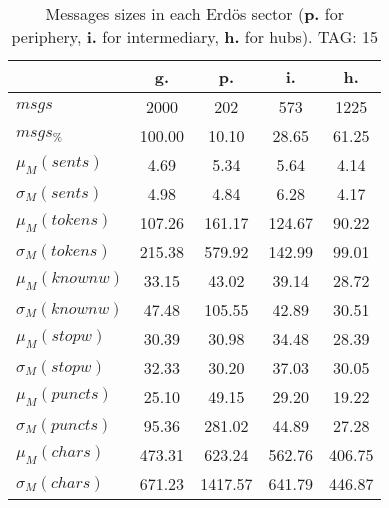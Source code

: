 \begin{table}[h!]
\begin{center}
\begin{tabular}{| l | c | c | c | c |}\hline
 & g. & p. & i. & h. \\\hline
$msgs$ & 2000  & 202  & 573  & 1225 \\\hline
$msgs_{\%}$ & 100.00  & 10.10  & 28.65  & 61.25 \\\hline
$\mu_M(sents)$ & 4.69  & 5.34  & 5.64  & 4.14 \\\hline
$\sigma_M(sents)$ & 4.98  & 4.84  & 6.28  & 4.17 \\\hline
$\mu_M(tokens)$ & 107.26  & 161.17  & 124.67  & 90.22 \\\hline
$\sigma_M(tokens)$ & 215.38  & 579.92  & 142.99  & 99.01 \\\hline
$\mu_M(knownw)$ & 33.15  & 43.02  & 39.14  & 28.72 \\\hline
$\sigma_M(knownw)$ & 47.48  & 105.55  & 42.89  & 30.51 \\\hline
$\mu_M(stopw)$ & 30.39  & 30.98  & 34.48  & 28.39 \\\hline
$\sigma_M(stopw)$ & 32.33  & 30.20  & 37.03  & 30.05 \\\hline
$\mu_M(puncts)$ & 25.10  & 49.15  & 29.20  & 19.22 \\\hline
$\sigma_M(puncts)$ & 95.36  & 281.02  & 44.89  & 27.28 \\\hline
$\mu_M(chars)$ & 473.31  & 623.24  & 562.76  & 406.75 \\\hline
$\sigma_M(chars)$ & 671.23  & 1417.57  & 641.79  & 446.87 \\\hline
\end{tabular}
\caption{Messages sizes in each Erd\"os sector ({{\bf p.}} for periphery, {{\bf i.}} for intermediary, {{\bf h.}} for hubs). TAG: 15}
\end{center}
\end{table}